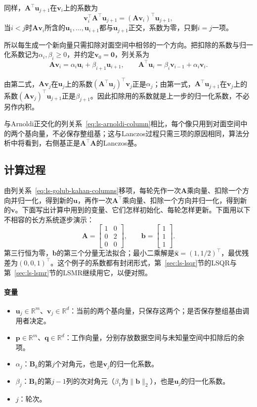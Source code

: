 同样，$\bm A^\top\bm u_{j+1}$在$\bm v_i$上的系数为
\[
 \bm v_i^\top\bm A^\top\bm u_{j+1}=(\bm A\bm v_i)^\top\bm u_{j+1} ,
\]
当$i<j$时$\bm A\bm v_i$所含的$\bm u_1,\ldots,\bm u_{i+1}$都与$\bm u_{j+1}$正交，系数为零，只剩$i=j$一项。

所以每生成一个新向量只需扣除对面空间中相邻的一个方向。把扣除的系数与归一化系数记为$\alpha_i,\beta_i\ge0$，并约定$\bm v_0=\bm 0$，列关系为
\begin{equation}
 \bm A\bm v_i=\alpha_i\bm u_i+\beta_{i+1}\bm u_{i+1},\qquad
 \bm A^\top\bm u_i=\beta_i\bm v_{i-1}+\alpha_i\bm v_i .
 \label{eq:ls-golub-kahan-columns}
\end{equation}

由第二式，$\bm A\bm v_j$在$\bm u_j$上的系数$(\bm A^\top\bm u_j)^\top\bm v_j$正是$\alpha_j$；由第一式，$\bm A^\top\bm u_{j+1}$在$\bm v_j$上的系数$(\bm A\bm v_j)^\top\bm u_{j+1}$正是$\beta_{j+1}$。因此扣除用的系数就是上一步的归一化系数，不必另作内积。

与Arnoldi正交化的列关系~\eqref{eq:ls-arnoldi-column}相比，每个像只用到对面空间中的两个基向量，不必保存整组基；这与Lanczos过程只需三项的原因相同，算法分析中将看到，右侧基正是$\bm A^\top\bm A$的Lanczos基。

\subsection{计算过程}

由列关系~\eqref{eq:ls-golub-kahan-columns}移项，每轮先作一次$\bm A$乘向量、扣除一个方向并归一化，得到新的$\bm u$，再作一次$\bm A^\top$乘向量、扣除一个方向并归一化，得到新的$\bm v$。下面写出计算中用到的变量、它们怎样初始化、每轮怎样更新。下面用以下不相容的长方系统逐步演示：
\[
 \bm A=\begin{bmatrix}1&0\\0&2\\0&0\end{bmatrix},\qquad
 \bm b=\begin{bmatrix}1\\1\\1\end{bmatrix}.
\]
第三行恒为零，$\bm b$的第三个分量无法拟合；最小二乘解是$\hat{\bm x}=(1,1/2)^\top$，最优残差为$(0,0,1)^\top$。这个例子的系数都有封闭形式，第~\ref{sec:ls-lsqr}节的LSQR与第~\ref{sec:ls-lsmr}节的LSMR继续用它，以便对照。

\paragraph{变量}
\begin{itemize}
 \item $\bm u_j\in\mathbb R^m$、$\bm v_j\in\mathbb R^d$：当前的两个基向量，只保存这两个；是否保存整组基由调用者决定。
 \item $\bm p\in\mathbb R^m$、$\bm q\in\mathbb R^d$：工作向量，分别存放数据空间与未知量空间中扣除后的余项。
 \item $\alpha_j$：$\bm B_k$的第$j$个对角元，也是$\bm v_j$的归一化系数。
 \item $\beta_j$：$\bm B_k$的第$j-1$列的次对角元（$\beta_1$为$\lVert\bm b\rVert_2$），也是$\bm u_j$的归一化系数。
 \item $j$：轮次。
\end{itemize}

